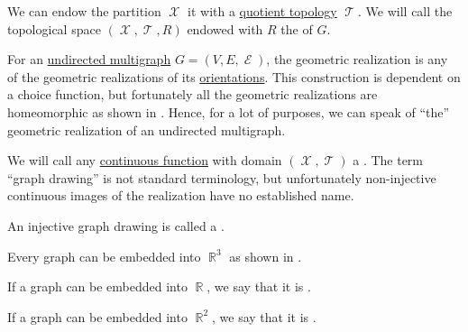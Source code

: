 \begin{definition}
  We can endow the partition \( \mscrX \) it with a \hyperref[def:topological_quotient]{quotient topology} \( \mscrT \). We will call the topological space \( (\mscrX, \mscrT, R) \) endowed with \( R \) the  of \( G \).

  \begin{thmenum}
     For an \hyperref[def:undirected_multigraph]{undirected multigraph} \( G = (V, E, \mscrE) \), the geometric realization is any of the geometric realizations of its \hyperref[def:multigraph_orientation]{orientations}. This construction is dependent on a choice function, but fortunately all the geometric realizations are homeomorphic as shown in . Hence, for a lot of purposes, we can speak of \enquote{the} geometric realization of an undirected multigraph.

     We will call any \hyperref[def:global_continuity]{continuous function} with domain \( (\mscrX, \mscrT) \) a . The term \enquote{graph drawing} is not standard terminology, but unfortunately non-injective continuous images of the realization have no established name.

     An injective graph drawing is called a .

    Every graph can be embedded into \( \BbbR^3 \) as shown in .

     If a graph can be embedded into \( \BbbR \), we say that it is .

     If a graph can be embedded into \( \BbbR^2 \), we say that it is .
  \end{thmenum}
\end{definition}

